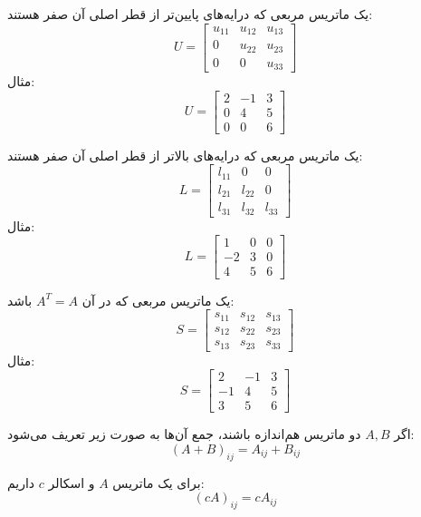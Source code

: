 \begin{definition}
	یک ماتریس مربعی که درایه‌های پایین‌تر از قطر اصلی آن صفر هستند:
	\[
	U =
	\begin{bmatrix}
		u_{11} & u_{12} & u_{13} \\
		0 & u_{22} & u_{23} \\
		0 & 0 & u_{33}
	\end{bmatrix}
	\]
	مثال:
	\[
	U =
	\begin{bmatrix}
		2 & -1 & 3 \\
		0 & 4 & 5 \\
		0 & 0 & 6
	\end{bmatrix}
	\]
\end{definition}
\begin{definition}
	یک ماتریس مربعی که درایه‌های بالاتر از قطر اصلی آن صفر هستند:
	\[
	L =
	\begin{bmatrix}
		l_{11} & 0 & 0 \\
		l_{21} & l_{22} & 0 \\
		l_{31} & l_{32} & l_{33}
	\end{bmatrix}
	\]
	مثال:
	\[
	L =
	\begin{bmatrix}
		1 & 0 & 0 \\
		-2 & 3 & 0 \\
		4 & 5 & 6
	\end{bmatrix}
	\]
\end{definition}
\begin{definition}
	یک ماتریس مربعی که در آن \( A^T = A \) باشد:
	\[
	S =
	\begin{bmatrix}
		s_{11} & s_{12} & s_{13} \\
		s_{12} & s_{22} & s_{23} \\
		s_{13} & s_{23} & s_{33}
	\end{bmatrix}
	\]
	مثال:
	\[
	S =
	\begin{bmatrix}
		2 & -1 & 3 \\
		-1 & 4 & 5 \\
		3 & 5 & 6
	\end{bmatrix}
	\]
\end{definition}
\begin{definition}
	اگر $A, B$ دو ماتریس هم‌اندازه باشند، جمع آن‌ها به صورت زیر تعریف می‌شود:
	\[ (A + B)_{ij} = A_{ij} + B_{ij} \]
	
	
\end{definition}
\begin{definition}
	برای یک ماتریس $A$ و اسکالر $c$ داریم:
	\[ (cA)_{ij} = c A_{ij} \]
	
\end{definition}

